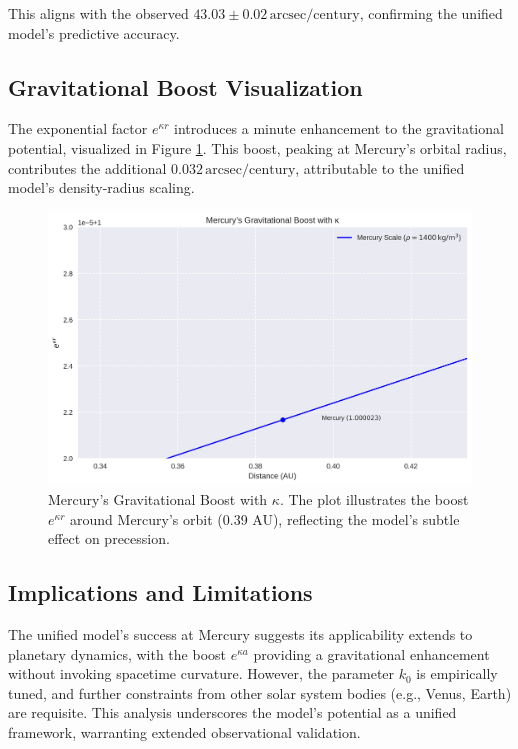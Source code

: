 \documentclass[a4paper,12pt]{article}
\begin{document}
This aligns with the observed \( 43.03 \pm 0.02 \, \text{arcsec/century} \), confirming the unified model's predictive accuracy.

\subsection{Gravitational Boost Visualization}
The exponential factor \( e^{\kappa r} \) introduces a minute enhancement to the gravitational potential, visualized in Figure \ref{fig:mercury_boost}. This boost, peaking at Mercury's orbital radius, contributes the additional \( 0.032 \, \text{arcsec/century} \), attributable to the unified model's density-radius scaling.

\begin{figure}[H]
    \centering
    \includegraphics[width=0.7\linewidth]{figures/mercury_boost.png}
    \caption{Mercury’s Gravitational Boost with \(\kappa\). The plot illustrates the boost \( e^{\kappa r} \) around Mercury’s orbit (0.39 AU), reflecting the model’s subtle effect on precession.}
    \label{fig:mercury_boost}
\end{figure}

\subsection{Implications and Limitations}
The unified model's success at Mercury suggests its applicability extends to planetary dynamics, with the boost \( e^{\kappa a} \) providing a gravitational enhancement without invoking spacetime curvature. However, the parameter \( k_0 \) is empirically tuned, and further constraints from other solar system bodies (e.g., Venus, Earth) are requisite. This analysis underscores the model's potential as a unified framework, warranting extended observational validation.
\end{document}
